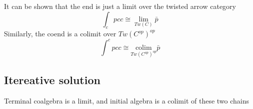 \documentclass[11pt]{amsart}
\begin{document}
It can be shown that the end is just a limit over the twisted arrow category
\[\int_c p c c \cong \lim_{Tw(C)} \bar p\]
Similarly, the coend is a colimit over $Tw(C^{op} )^{op}$
\[\int^c p c c \cong \underset {Tw(C^{op})^{op}}  { \mbox{colim}} \bar p\]

\subsection{Itereative solution}
Terminal coalgebra is a limit, and initial algebra is a colimit of these two chains
\begin{figure}[H]
\centering
{}
\end{figure}
\end{document}
